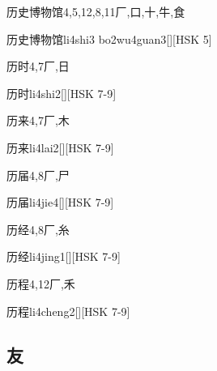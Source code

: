 \begin{Entry}{历史博物馆}{4,5,12,8,11}{⼚,⼝,⼗,⽜,⾷}
  \begin{Phonetics}{历史博物馆}{li4shi3 bo2wu4guan3}[][HSK 5]
  \end{Phonetics}
\end{Entry}

\begin{Entry}{历时}{4,7}{⼚,⽇}
  \begin{Phonetics}{历时}{li4shi2}[][HSK 7-9]
  \end{Phonetics}
\end{Entry}

\begin{Entry}{历来}{4,7}{⼚,⽊}
  \begin{Phonetics}{历来}{li4lai2}[][HSK 7-9]
  \end{Phonetics}
\end{Entry}

\begin{Entry}{历届}{4,8}{⼚,⼫}
  \begin{Phonetics}{历届}{li4jie4}[][HSK 7-9]
  \end{Phonetics}
\end{Entry}

\begin{Entry}{历经}{4,8}{⼚,⽷}
  \begin{Phonetics}{历经}{li4jing1}[][HSK 7-9]
  \end{Phonetics}
\end{Entry}

\begin{Entry}{历程}{4,12}{⼚,⽲}
  \begin{Phonetics}{历程}{li4cheng2}[][HSK 7-9]
  \end{Phonetics}
\end{Entry}

\subsection*{友}

